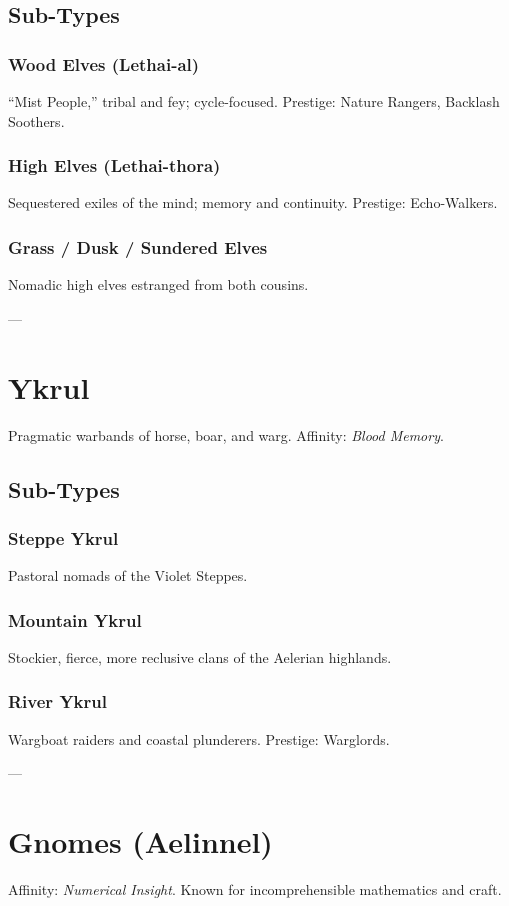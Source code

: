\documentclass[11pt]{book}
\begin{document}
\subsection{Sub-Types}
\subsubsection{Wood Elves (Lethai-al)}
“Mist People,” tribal and fey; cycle-focused. Prestige: Nature Rangers, Backlash Soothers.  

\subsubsection{High Elves (Lethai-thora)}
Sequestered exiles of the mind; memory and continuity. Prestige: Echo-Walkers.  

\subsubsection{Grass / Dusk / Sundered Elves}
Nomadic high elves estranged from both cousins.  

---

\section{Ykrul}
Pragmatic warbands of horse, boar, and warg.  
Affinity: \emph{Blood Memory}.  

\subsection{Sub-Types}
\subsubsection{Steppe Ykrul}
Pastoral nomads of the Violet Steppes.  

\subsubsection{Mountain Ykrul}
Stockier, fierce, more reclusive clans of the Aelerian highlands.  

\subsubsection{River Ykrul}
Wargboat raiders and coastal plunderers. Prestige: Warglords.  

---

\section{Gnomes (Aelinnel)}
Affinity: \emph{Numerical Insight}. Known for incomprehensible mathematics and craft.  
\end{document}

